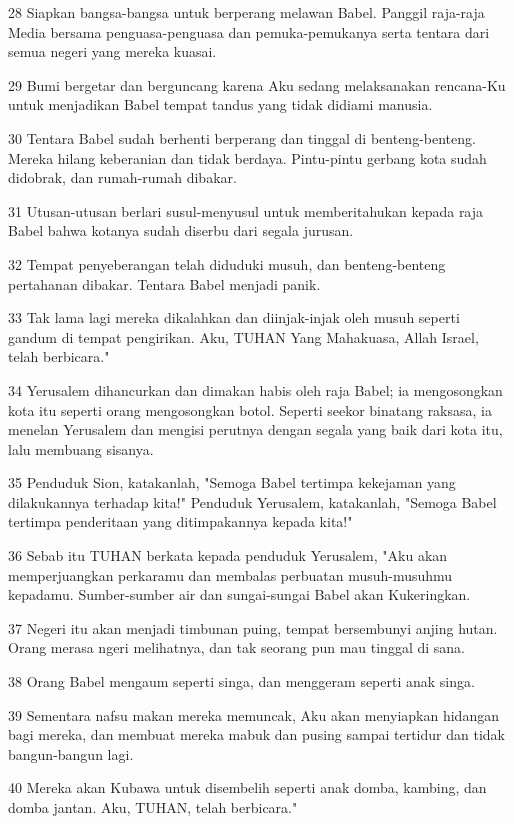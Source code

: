 \par 28 Siapkan bangsa-bangsa untuk berperang melawan Babel. Panggil raja-raja Media bersama penguasa-penguasa dan pemuka-pemukanya serta tentara dari semua negeri yang mereka kuasai.
\par 29 Bumi bergetar dan berguncang karena Aku sedang melaksanakan rencana-Ku untuk menjadikan Babel tempat tandus yang tidak didiami manusia.
\par 30 Tentara Babel sudah berhenti berperang dan tinggal di benteng-benteng. Mereka hilang keberanian dan tidak berdaya. Pintu-pintu gerbang kota sudah didobrak, dan rumah-rumah dibakar.
\par 31 Utusan-utusan berlari susul-menyusul untuk memberitahukan kepada raja Babel bahwa kotanya sudah diserbu dari segala jurusan.
\par 32 Tempat penyeberangan telah diduduki musuh, dan benteng-benteng pertahanan dibakar. Tentara Babel menjadi panik.
\par 33 Tak lama lagi mereka dikalahkan dan diinjak-injak oleh musuh seperti gandum di tempat pengirikan. Aku, TUHAN Yang Mahakuasa, Allah Israel, telah berbicara."
\par 34 Yerusalem dihancurkan dan dimakan habis oleh raja Babel; ia mengosongkan kota itu seperti orang mengosongkan botol. Seperti seekor binatang raksasa, ia menelan Yerusalem dan mengisi perutnya dengan segala yang baik dari kota itu, lalu membuang sisanya.
\par 35 Penduduk Sion, katakanlah, "Semoga Babel tertimpa kekejaman yang dilakukannya terhadap kita!" Penduduk Yerusalem, katakanlah, "Semoga Babel tertimpa penderitaan yang ditimpakannya kepada kita!"
\par 36 Sebab itu TUHAN berkata kepada penduduk Yerusalem, "Aku akan memperjuangkan perkaramu dan membalas perbuatan musuh-musuhmu kepadamu. Sumber-sumber air dan sungai-sungai Babel akan Kukeringkan.
\par 37 Negeri itu akan menjadi timbunan puing, tempat bersembunyi anjing hutan. Orang merasa ngeri melihatnya, dan tak seorang pun mau tinggal di sana.
\par 38 Orang Babel mengaum seperti singa, dan menggeram seperti anak singa.
\par 39 Sementara nafsu makan mereka memuncak, Aku akan menyiapkan hidangan bagi mereka, dan membuat mereka mabuk dan pusing sampai tertidur dan tidak bangun-bangun lagi.
\par 40 Mereka akan Kubawa untuk disembelih seperti anak domba, kambing, dan domba jantan. Aku, TUHAN, telah berbicara."
